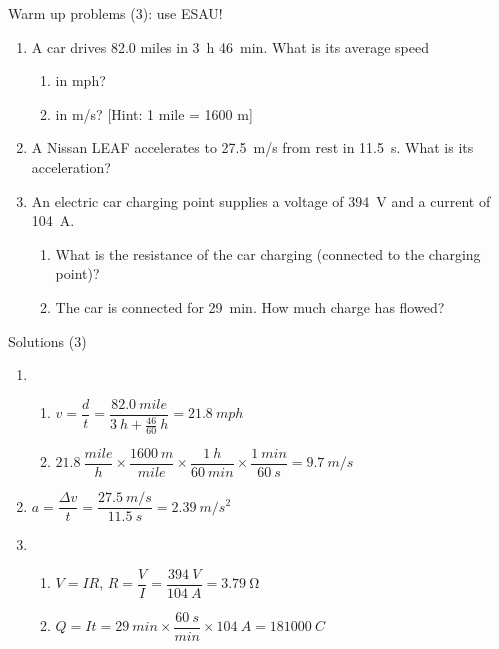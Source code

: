 \documentclass[14pt]{beamer}
\begin{document}
\begin{frame}{Warm up problems (3): use ESAU!}
\begin{enumerate}
\item\label{1.1} A car drives 82.0 miles in 3~h 46~min.  What is its average speed
\begin{enumerate}
\item in mph?
\item in m/s? [Hint: 1 mile = 1600 m]
\end{enumerate}
\item\label{3.1} A Nissan LEAF accelerates to \SI{27.5}{m/s} from rest in \SI{11.5}{s}.  What is its acceleration?
\item An electric car charging point supplies a voltage of \SI{394}{V} and a current of \SI{104}{A}.
\begin{enumerate}
\item\label{11.3} What is the resistance of the car charging (connected to the charging point)?
\item\label{10.1} The car is connected for \SI{29}{min}.  How much charge has flowed?
\end{enumerate}
\end{enumerate}
\end{frame}

\begin{frame}{Solutions (3)}
\begin{enumerate}
\item \begin{enumerate}
\item $v=\dfrac{d}{t}=\dfrac{\SI{82.0}{mile}}{\SI{3}{h}+\frac{46}{60}~\si{h}}=\SI{21.8}{mph}$
\item $21.8~\dfrac{\si{mile}}{\si{h}}\times\dfrac{\SI{1600}{m}}{\si{mile}}\times\dfrac{\SI{1}{h}}{\SI{60}{min}}\times\dfrac{\SI{1}{min}}{\SI{60}{s}}=\SI{9.7}{m/s}$
\end{enumerate}
\item $a=\dfrac{\Delta v}{t}=\dfrac{\SI{27.5}{m/s}}{\SI{11.5}{s}}=\SI{2.39}{m/s^{2}}$
\item \begin{enumerate}
\item $V=IR$, $R=\dfrac{V}{I}=\dfrac{\SI{394}{V}}{\SI{104}{A}}=\SI{3.79}{\ohm}$
\item $Q=It=\SI{29}{min}\times\dfrac{\SI{60}{s}}{\si{min}}\times\SI{104}{A}=\SI{181000}{C}$
\end{enumerate}
\end{enumerate}
\end{frame}
\end{document}
